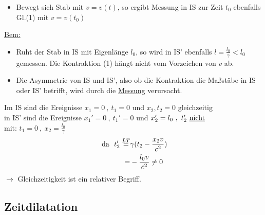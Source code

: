 \documentclass[titlepage,12pt,a4paper,ngerman]{report}
\newcommand{\tx}[1]{\textrm{#1}}
\begin{document}
{\begin{itemize}
	\item Bewegt sich Stab mit $ v = v(t) $, so ergibt Messung in IS zur Zeit $ t_0 $ ebenfalls Gl.(1) mit $ v=v(t_0) $
\end{itemize}
\underline{Bem:}
\begin{itemize}
	\item Ruht der Stab in IS mit Eigenlänge $ l_0 $, so wird in IS' ebenfalls $ l=\frac{l_0}{\gamma} < l_0 $ gemessen. Die Kontraktion (1) hängt nicht vom Vorzeichen von $ v $ ab.
	\item Die Asymmetrie von IS und IS', also ob die Kontraktion die Maßstäbe in IS oder IS' betrifft, wird durch die \underline{Messung} verursacht.
\end{itemize}
Im IS sind die Ereignisse $ x_1 = 0\ , \ t_1 = 0 $ und $ x_2,t_2 = 0 $ gleichzeitig\\
in IS' sind die Ereignisse $ x_1' = 0 \ , \ t_1' = 0 $ und $ x_2' = l_0 \ , \ t_2' \tx{ \underline{nicht} } $\\
mit: $ t_1 = 0  \ , \ x_2 = \frac{l_0}{\gamma} $
\begin{align*}
\tx{ da } \ t_2' \buildrel LT \over = &\gamma (t_2 - \frac{x_2 v}{c^2})\\
= &- \frac{l_0 v}{c^2} \neq 0
\end{align*} 
$ \rightarrow $ Gleichzeitigkeit ist ein relativer Begriff.

\subsection{Zeitdilatation}


}
\end{document}
